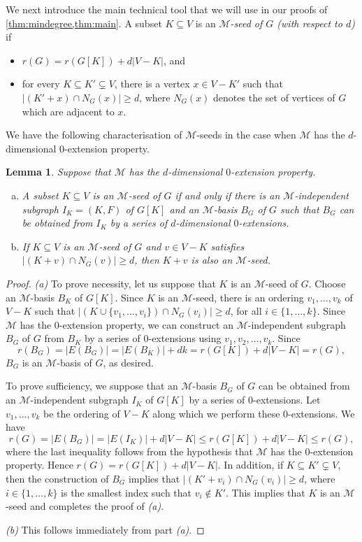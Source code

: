 \documentclass[11pt,a4paper,dvipsnames]{scrartcl}
\newtheorem{lemma}[theorem]{Lemma}
\newcommand{\cM}{{\mathcal{M}}}
\begin{document}
    We next introduce the main technical tool that we will use in our proofs of \cref{thm:mindegree,thm:main}. 
A subset $K\subseteq V$ is an \emph{$\cM$-seed of $G$ (with respect to $d$)} if
\begin{itemize} \itemsep0pt
    \item $r(G)=r(G[K])+d|V - K|$, and
    \item for every $K\subseteq K'\subsetneq V$, there is a vertex $x\in V-K'$ such that $|(K'+x)\cap N_G(x)|\geq d$, where $N_G(x)$ denotes the set of vertices of $G$ which are adjacent to $x$.  
\end{itemize}
We have the following characterisation of $\cM$-seeds in the case when $\cM$ has the $d$-dimensional 0-extension property.
\begin{lemma}\label{lem:seed:altdef}
    Suppose that $\cM$ has
    the $d$-dimensional $0$-extension property. 
    \begin{enumerate}[(a)]
        \item A subset $K \subseteq V$ is an $\cM$-seed of $G$ if and only if there is an $\cM$-independent subgraph $I_K = (K,F)$ of $G[K]$ and an $\cM$-basis $B_G$ of $G$ such that $B_G$ can be obtained from $I_K$ by a series of $d$-dimensional $0$-extensions.
        \item If $K \subseteq V$ is an $\cM$-seed of $G$ and $v\in V-K$ satisfies $|(K+v)\cap N_G(v)|\geq d$, then $K+v$ is also an $\cM$-seed.
    \end{enumerate}
\end{lemma}
\begin{proof} \emph{(a)}
    To prove necessity, let us suppose that $K$ is an $\cM$-seed of $G$. Choose an $\cM$-basis $B_K$ of $G[K]$.  Since $K$ is an $\cM$-seed, there is an ordering $v_1,\ldots,v_k$ of $V-K$ such that 
    $|(K \cup \{v_1,\ldots,v_{i}\}) \cap N_G(v_i)| \geq d$,
    for all $i \in \{1,\ldots,k\}$. Since $\cM$ has the $0$-extension property, we can construct an $\cM$-independent subgraph $B_G$ of $G$ from $B_K$ by a series of 0-extensions using $v_1,v_2,\ldots,v_k$. Since \[r(B_G) = |E(B_G)| = |E(B_K)| + dk = r(G[K]) + d|V - K| = r(G),\] $B_G$ is an $\cM$-basis of $G$, as desired.
    
    To prove sufficiency, we suppose that an $\cM$-basis $B_G$ of $G$ can be obtained from an $\cM$-independent subgraph $I_K$ of $G[K]$ by a series of 0-extensions. Let $v_1,\ldots,v_k$ be the ordering of $V-K$ along which we perform these 0-extensions. We have 
    \[r(G) = |E(B_G)| = |E(I_K)| + d|V-K| \leq r(G[K]) + d|V-K| \leq r(G),\] 
    where the last inequality follows from 
    the hypothesis that $\cM$ has the 0-extension property. Hence $r(G)=r(G[K])+d|V - K|$. In addition, if $K \subseteq K' \subsetneq V$, then the construction of $B_G$ implies that $|(K'+v_i)\cap N_G(v_i)|\geq d$, where $i \in \{1,\ldots,k\}$ is the smallest index such that $v_i \notin K'$. This implies that $K$ is an $\cM$-seed and completes the proof of \emph{(a)}.

    \emph{(b)} This follows immediately from part \emph{(a)}.
\end{proof}
\end{document}
